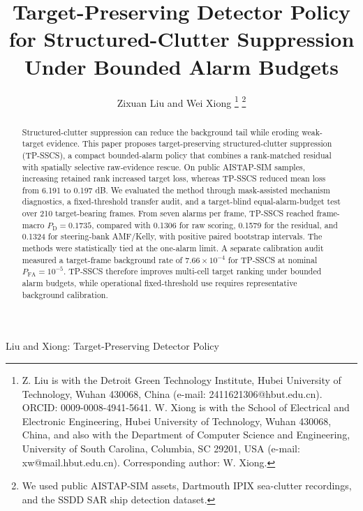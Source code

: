 \documentclass[journal]{IEEEtran}
\begin{document}
\title{Target-Preserving Detector Policy for Structured-Clutter Suppression Under Bounded Alarm Budgets}

\author{Zixuan Liu and Wei Xiong%
\thanks{Z. Liu is with the Detroit Green Technology Institute, Hubei University of Technology, Wuhan 430068, China (e-mail: 2411621306@hbut.edu.cn). ORCID: 0009-0008-4941-5641. W. Xiong is with the School of Electrical and Electronic Engineering, Hubei University of Technology, Wuhan 430068, China, and also with the Department of Computer Science and Engineering, University of South Carolina, Columbia, SC 29201, USA (e-mail: xw@mail.hbut.edu.cn). Corresponding author: W. Xiong.}%
\thanks{We used public AISTAP-SIM assets, Dartmouth IPIX sea-clutter recordings, and the SSDD SAR ship detection dataset.}}

%
{Liu and Xiong: Target-Preserving Detector Policy}

\maketitle
\linespread{0.96}\selectfont

\begin{abstract}
Structured-clutter suppression can reduce the background tail while eroding weak-target evidence. This paper proposes target-preserving structured-clutter suppression (TP-SSCS), a compact bounded-alarm policy that combines a rank-matched residual with spatially selective raw-evidence rescue. On public AISTAP-SIM samples, increasing retained rank increased target loss, whereas TP-SSCS reduced mean loss from 6.191 to 0.197 dB. We evaluated the method through mask-assisted mechanism diagnostics, a fixed-threshold transfer audit, and a target-blind equal-alarm-budget test over 210 target-bearing frames. From seven alarms per frame, TP-SSCS reached frame-macro $P_{\mathrm{D}}=0.1735$, compared with 0.1306 for raw scoring, 0.1579 for the residual, and 0.1324 for steering-bank AMF/Kelly, with positive paired bootstrap intervals. The methods were statistically tied at the one-alarm limit. A separate calibration audit measured a target-frame background rate of $7.66\times10^{-4}$ for TP-SSCS at nominal $P_{\mathrm{FA}}=10^{-5}$. TP-SSCS therefore improves multi-cell target ranking under bounded alarm budgets, while operational fixed-threshold use requires representative background calibration.
\end{abstract}
\end{document}
